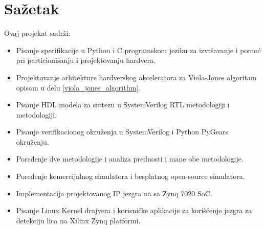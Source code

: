 \section{Sažetak}

Ovaj projekat sadrži:
\begin{itemize}
  \item Pisanje specifikacije u Python i C programskom jeziku za izvršavanje i
    pomoć pri particionisanju i projektovanju hardvera.
  \item Projektovanje arhitekture hardverskog akceleratora za Viola-Jones algoritam opisam u delu \ref{viola_jones_algorithm}.
  \item Pisanje HDL modela za sintezu u SystemVerilog RTL metodologiji i
    \PyGears{} metodologiji.
  \item Pisanje verifikacionog okruženja u SystemVerilog \UVM{} i Python PyGears
    okruženju.
  \item Poređenje dve metodologije i analiza prednosti i mane obe metodologije.
  \item Poređenje komercijalnog \QuestaSim{} simulatora i besplatnog open-source
    \Verilator{} simulatora.
  \item Implementacija projektovanog IP jezgra na \ZTurn{} sa Zynq
    7020 SoC.
  \item Pisanje Linux Kernel drajvera i korisničke aplikacije za korišćenje
    jezgra za detekciju lica na Xilinx Zynq platformi.

\end{itemize}